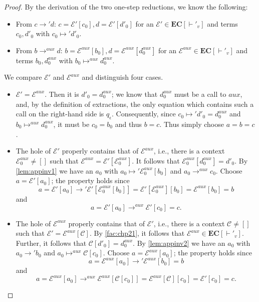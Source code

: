 \comminv*
\begin{proof}

By the derivation of the two one-step reductions, we know the following:
\begin{itemize}
\item From $c \longrightarrow' d$: $c = \mathcal{E}'[c_0], d = \mathcal{E}'[d'_0]$ for an $\mathcal{E}' \in \mathbf{EC}[\vdash'_v]$ and terms $c_0, d'_0$ with $c_0 \mapsto' d'_0$.

\item From $b \longrightarrow^{aux} d$: $b = \mathcal{E}^{aux}[b_0], d = \mathcal{E}^{aux}[d^{aux}_0]$ for an $\mathcal{E}^{aux} \in \mathbf{EC}[\vdash'_v]$ and terms $b_0, d^{aux}_0$ with $b_0 \mapsto^{aux} d^{aux}_0$.
\end{itemize}

We compare $\mathcal{E}'$ and $\mathcal{E}^{aux}$ and distinguish four cases.

\begin{itemize}
\item $\mathcal{E}' = \mathcal{E}^{aux}$. Then it is $d'_0 = d^{aux}_0$; we know that $d^{aux}_0$ must be a call to $aux$, and, by the definition of extractions, the only equation which contains such a call on the right-hand side is $q_\epsilon$. Consequently, since $c_0 \mapsto' d'_0 = d^{aux}_0$ and $b_0 \mapsto^{aux} d^{aux}_0$, it must be $c_0 = b_0$ and thus $b = c$. Thus simply choose $a = b = c$.

\item The hole of $\mathcal{E}'$ properly contains that of $\mathcal{E}^{aux}$, i.e., there is a context $\mathcal{E}^{aux}_0 \neq []$ such that $\mathcal{E}^{aux} = \mathcal{E}'[\mathcal{E}^{aux}_0]$. It follows that $\mathcal{E}^{aux}_0[d^{aux}_0] = d'_0$. By \autoref{lem:appinv1} we have an $a_0$ with $a_0 \mapsto' \mathcal{E}^{aux}_0[b_0]$ and $a_0 \longrightarrow^{aux} c_0$. Choose $a = \mathcal{E}'[a_0]$; the property holds since
\[
a = \mathcal{E}'[a_0] \longrightarrow' \mathcal{E}'[\mathcal{E}^{aux}_0[b_0]] = \mathcal{E}'[\mathcal{E}^{aux}_0][b_0] = \mathcal{E}^{aux}[b_0] = b
\]
and
\[
a = \mathcal{E}'[a_0] \longrightarrow^{aux} \mathcal{E}'[c_0] = c.
\]

\item The hole of $\mathcal{E}^{aux}$ properly contains that of $\mathcal{E}'$, i.e., there is a context $\mathcal{C} \neq []$ such that $\mathcal{E}' = \mathcal{E}^{aux}[\mathcal{C}]$. By \autoref{fac:chp21}, it follows that $\mathcal{E}^{aux} \in \mathbf{EC}[\vdash'_v]$. Further, it follows that $\mathcal{C}[d'_0] = d^{aux}_0$. By \autoref{lem:appinv2} we have an $a_0$ with $a_0 \longrightarrow' b_0$ and $a_0 \mapsto^{aux} \mathcal{C}[c_0]$. Choose $a = \mathcal{E}^{aux}[a_0]$; the property holds since
\[
a = \mathcal{E}^{aux}[a_0] \longrightarrow' \mathcal{E}^{aux}[b_0] = b
\]
and
\[
a = \mathcal{E}^{aux}[a_0] \longrightarrow^{aux} \mathcal{E}^{aux}[\mathcal{C}[c_0]] = \mathcal{E}^{aux}[\mathcal{C}][c_0] = \mathcal{E}'[c_0] = c.
\]


\end{itemize}
\end{proof}
